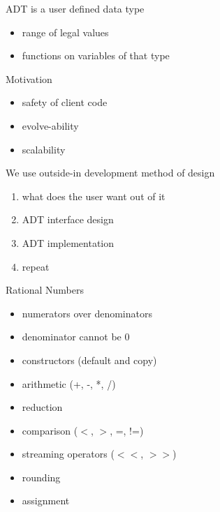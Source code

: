 \documentclass[12pt]{article}
\begin{document}
ADT is a user defined data type
\begin{itemize}
\item range of legal values
\item functions on variables of that type
\end{itemize}
Motivation
\begin{itemize}
\item safety of client code
\item evolve-ability
\item scalability
\end{itemize}
We use outside-in development method of design
\begin{enumerate}
\item what does the user want out of it
\item ADT interface design
\item ADT implementation
\item repeat
\end{enumerate}
Rational Numbers
\begin{itemize}
\item numerators over denominators
\item denominator cannot be 0
\item constructors (default and copy)
\item arithmetic (+, -, *, /)
\item reduction
\item comparison ($<$, $>$, =, !=)
\item streaming operators ($<<$, $>>$)
\item rounding
\item assignment
\end{itemize}
\end{document}
